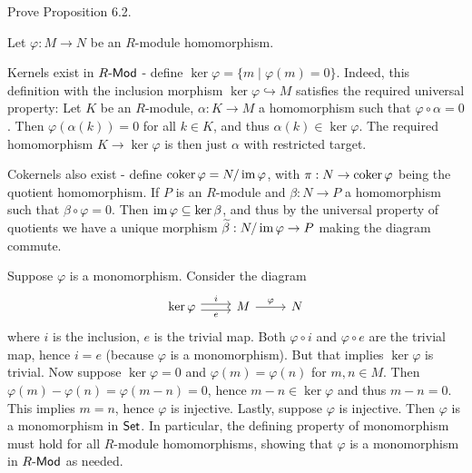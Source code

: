 \begin{problem}
	Prove Proposition 6.2.
\end{problem}

\begin{solution}
	Let $\varphi: M \to N$ be an $R$-module homomorphism.
	
	Kernels exist in $R\text{-}\mathsf{Mod}$ - define $\ker \varphi = \{ m \mid \varphi(m) = 0 \}$. Indeed, this definition with the inclusion morphism $\ker \varphi \hookrightarrow M$ satisfies the required universal property: Let $K$ be an $R$-module, $\alpha: K \to M$ a homomorphism such that $\varphi \circ \alpha = 0$. Then $\varphi(\alpha(k)) = 0$ for all $k \in K$, and thus $\alpha(k) \in \ker \varphi$. The required homomorphism $K \to \ker \varphi$ is then just $\alpha$ with restricted target.
	
	Cokernels also exist - define $\operatorname{coker} \varphi = N/\operatorname{im} \varphi$, with $\pi: N \to \operatorname{coker} \varphi$ being the quotient homomorphism. If $P$ is an $R$-module and $\beta: N \to P$ a homomorphism such that $\beta \circ \varphi = 0$. Then $\operatorname{im} \varphi \subseteq \ker \beta$, and thus by the universal property of quotients we have a unique morphism $\widetilde{\beta}: N/\operatorname{im} \varphi \to P$ making the diagram commute.
	
	Suppose $\varphi$ is a monomorphism. Consider the diagram
	\begin{equation*}
		\begin{tikzcd}
			\ker \varphi
			\arrow[r, shift left, "i"]
			\arrow[r, shift right, "e"']
			& M
			\arrow[r, "\varphi"]
			& N
		\end{tikzcd}
	\end{equation*}
	where $i$ is the inclusion, $e$ is the trivial map. Both $\varphi \circ i$ and $\varphi \circ e$ are the trivial map, hence $i = e$ (because $\varphi$ is a monomorphism). But that implies $\ker \varphi$ is trivial. Now suppose $\ker \varphi = 0$ and $\varphi(m) = \varphi(n)$ for $m, n \in M$. Then $\varphi(m) - \varphi(n) = \varphi(m - n) = 0$, hence $m - n \in \ker \varphi$ and thus $m - n = 0$. This implies $m = n$, hence $\varphi$ is injective. Lastly, suppose $\varphi$ is injective. Then $\varphi$ is a monomorphism in $\mathsf{Set}$. In particular, the defining property of monomorphism must hold for all $R$-module homomorphisms, showing that $\varphi$ is a monomorphism in $R\text{-}\mathsf{Mod}$ as needed.
	

\end{solution}
